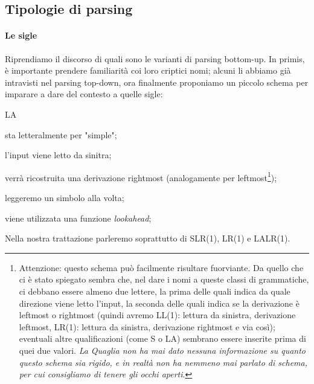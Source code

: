 \documentclass[class=book, crop=false, oneside, 12pt]{standalone}
\begin{document}
\subsection{Tipologie di parsing}
\paragraph{Le sigle}
Riprendiamo il discorso di quali sono le varianti di parsing bottom-up. In primis, è importante prendere familiarità coi loro criptici nomi; alcuni li abbiamo già intravisti nel parsing top-down, ora finalmente proponiamo un piccolo schema per imparare a dare del contesto a quelle sigle:
\begin{labeling}{LA}
    \item[S] sta letteralmente per "simple";  
    \item[L] l'input viene letto da sinitra;
    \item[R] verrà ricostruita una derivazione rightmost (analogamente per leftmost\footnote{Attenzione: questo schema può facilmente risultare fuorviante. Da quello che ci è stato spiegato sembra che, nel dare i nomi a queste classi di grammatiche, ci debbano essere almeno due lettere, la prima delle quali indica da quale direzione viene letto l'input, la seconda delle quali indica se la derivazione è leftmost o rightmost (quindi avremo LL(1): lettura da sinistra, derivazione leftmost, LR(1): lettura da sinistra, derivazione rightmost e via così); eventuali altre qualificazioni (come S o LA) sembrano essere inserite prima di quei due valori. \emph{La Quaglia non ha mai dato nessuna informazione su quanto questo schema sia rigido, e in realtà non ha nemmeno mai parlato di schema, per cui consigliamo di tenere gli occhi aperti}.});
    \item[1] leggeremo un simbolo alla volta;
    \item[LA] viene utilizzata una funzione \emph{lookahead};
\end{labeling}
Nella nostra trattazione parleremo soprattutto di SLR(1), LR(1) e LALR(1).
\end{document}
